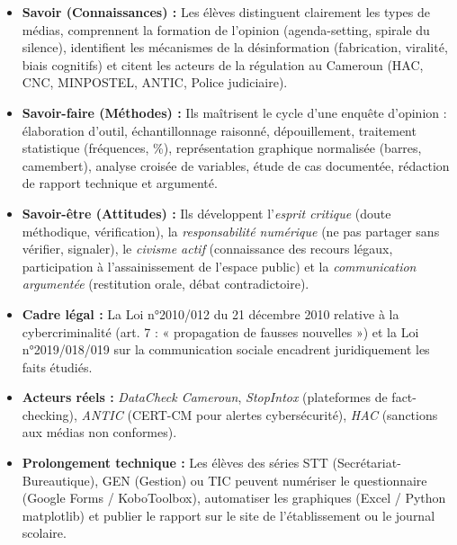 \documentclass[11pt]{article}
\begin{document}
\begin{aretenir}
\begin{itemize}
    \item \textbf{Savoir (Connaissances) :} Les élèves distinguent clairement les types de médias, comprennent la formation de l'opinion (agenda-setting, spirale du silence), identifient les mécanismes de la désinformation (fabrication, viralité, biais cognitifs) et citent les acteurs de la régulation au Cameroun (HAC, CNC, MINPOSTEL, ANTIC, Police judiciaire).
    \item \textbf{Savoir-faire (Méthodes) :} Ils maîtrisent le cycle d'une enquête d'opinion : élaboration d'outil, échantillonnage raisonné, dépouillement, traitement statistique (fréquences, \%), représentation graphique normalisée (barres, camembert), analyse croisée de variables, étude de cas documentée, rédaction de rapport technique et argumenté.
    \item \textbf{Savoir-être (Attitudes) :} Ils développent l'\emph{esprit critique} (doute méthodique, vérification), la \emph{responsabilité numérique} (ne pas partager sans vérifier, signaler), le \emph{civisme actif} (connaissance des recours légaux, participation à l'assainissement de l'espace public) et la \emph{communication argumentée} (restitution orale, débat contradictoire).
\end{itemize}
\end{aretenir}

\begin{savaistu}
\begin{itemize}
    \item \textbf{Cadre légal :} La Loi n°2010/012 du 21 décembre 2010 relative à la cybercriminalité (art. 7 : « propagation de fausses nouvelles ») et la Loi n°2019/018/019 sur la communication sociale encadrent juridiquement les faits étudiés.
    \item \textbf{Acteurs réels :} \emph{DataCheck Cameroun}, \emph{StopIntox} (plateformes de fact-checking), \emph{ANTIC} (CERT-CM pour alertes cybersécurité), \emph{HAC} (sanctions aux médias non conformes).
    \item \textbf{Prolongement technique :} Les élèves des séries STT (Secrétariat-Bureautique), GEN (Gestion) ou TIC peuvent numériser le questionnaire (Google Forms / KoboToolbox), automatiser les graphiques (Excel / Python matplotlib) et publier le rapport sur le site de l'établissement ou le journal scolaire.
\end{itemize}
\end{savaistu}
\end{document}
